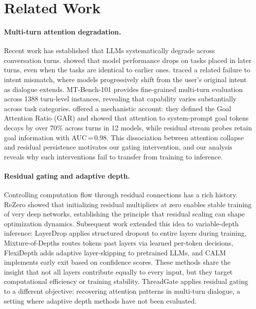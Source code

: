 \section{Related Work}\label{sec:related}

\paragraph{Multi-turn attention degradation.}
Recent work has established that LLMs systematically degrade across conversation turns. \citet{levy2025lost} showed that model performance drops on tasks placed in later turns, even when the tasks are identical to earlier ones. \citet{liu2026intent} traced a related failure to intent mismatch, where models progressively shift from the user's original intent as dialogue extends. MT-Bench-101 \citep{bai2024mtbench101} provides fine-grained multi-turn evaluation across 1388 turn-level instances, revealing that capability varies substantially across task categories. \citet{dongre2026attention} offered a mechanistic account: they defined the Goal Attention Ratio (GAR) and showed that attention to system-prompt goal tokens decays by over 70\% across turns in 12 models, while residual stream probes retain goal information with AUC\,=\,0.98. This dissociation between attention collapse and residual persistence motivates our gating intervention, and our analysis reveals why such interventions fail to transfer from training to inference.

\paragraph{Residual gating and adaptive depth.}
Controlling computation flow through residual connections has a rich history. ReZero \citep{bachlechner2021rezero} showed that initializing residual multipliers at zero enables stable training of very deep networks, establishing the principle that residual scaling can shape optimization dynamics. Subsequent work extended this idea to variable-depth inference: LayerDrop \citep{fan2020layerdrop} applies structured dropout to entire layers during training, Mixture-of-Depths \citep{raposo2024mixture} routes tokens past layers via learned per-token decisions, FlexiDepth \citep{luo2025flexidepth} adds adaptive layer-skipping to pretrained LLMs, and CALM \citep{schuster2022calm} implements early exit based on confidence scores. These methods share the insight that not all layers contribute equally to every input, but they target computational efficiency or training stability. ThreadGate applies residual gating to a different objective: recovering attention patterns in multi-turn dialogue, a setting where adaptive depth methods have not been evaluated.

